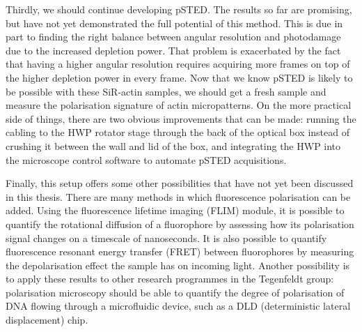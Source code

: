 Thirdly, we should continue developing pSTED. The results so far are promising, but have not yet demonstrated the full potential of this method. This is due in part to finding the right balance between angular resolution and photodamage due to the increased depletion power. That problem is exacerbated by the fact that having a higher angular resolution requires acquiring more frames on top of the higher depletion power in every frame. Now that we know pSTED is likely to be possible with these SiR-actin samples, we should get a fresh sample and measure the polarisation signature of actin micropatterns. On the more practical side of things, there are two obvious improvements that can be made: running the cabling to the HWP rotator stage through the back of the optical box instead of crushing it between the wall and lid of the box, and integrating the HWP into the microscope control software to automate pSTED acquisitions.

Finally, this setup offers some other possibilities that have not yet been discussed in this thesis. There are many methods in which fluorescence polarisation can be added. Using the fluorescence lifetime imaging (FLIM) module, it is possible to quantify the rotational diffusion of a fluorophore by assessing how its polarisation signal changes on a timescale of nanoseconds. It is also possible to quantify fluorescence resonant energy transfer (FRET) between fluorophores by measuring the depolarisation effect the sample has on incoming light. Another possibility is to apply these results to other research programmes in the Tegenfeldt group: polarisation microscopy should be able to quantify the degree of polarisation of DNA flowing through a microfluidic device, such as a DLD (deterministic lateral displacement) chip.